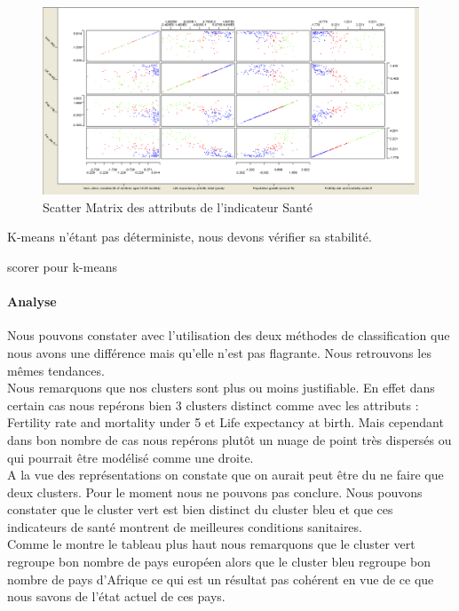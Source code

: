 \begin{figure}[H]
	\begin{center}
		\includegraphics[scale=0.5]{Image/scattermatrixSantekmeansNoMissing2}
		\caption{Scatter Matrix des attributs de l'indicateur Santé \jeuc}
	\end{center}
\end{figure}

K-means n'étant pas déterministe, nous devons vérifier sa stabilité.

\begin{Huge} 
scorer pour k-means 
\end{Huge}

\paragraph{Analyse}
Nous pouvons constater avec l'utilisation des deux méthodes de classification que nous avons une différence mais qu'elle n'est pas flagrante. Nous retrouvons les mêmes tendances.\\
Nous remarquons que nos clusters sont plus ou moins justifiable. En effet dans certain cas nous repérons bien 3 clusters distinct comme avec les attributs : Fertility rate and mortality under 5 et Life expectancy at birth. Mais cependant dans bon nombre de cas nous repérons plutôt un nuage de point très dispersés ou qui pourrait être modélisé comme une droite.\\
A la vue des représentations on constate que on aurait peut être du ne faire que deux clusters. Pour le moment nous ne pouvons pas conclure. Nous pouvons constater que le cluster vert est bien distinct du cluster bleu et que ces indicateurs de santé montrent de meilleures conditions  sanitaires.\\
Comme le montre le tableau plus haut nous remarquons que le cluster vert regroupe bon nombre de pays européen alors que le cluster bleu regroupe bon nombre de pays d'Afrique ce qui est un résultat pas cohérent en vue de ce que nous savons de l'état actuel de ces pays.


